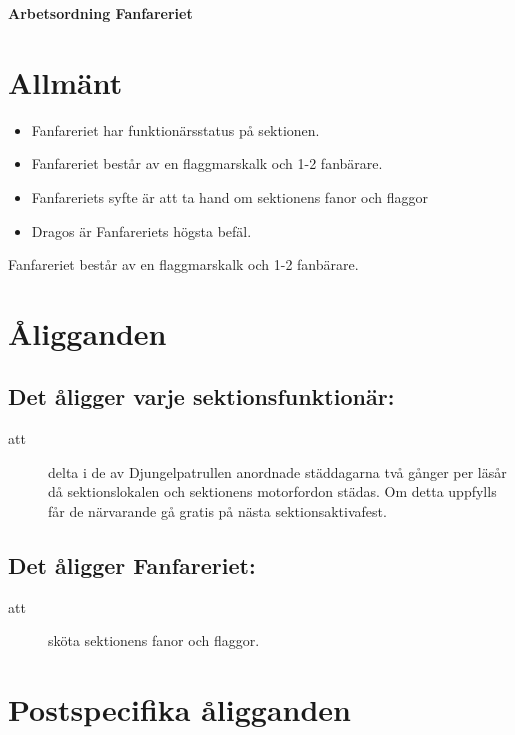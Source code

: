 \renewcommand{\dateseparator}{-} %

\renewcommand{\forening}{Fysikteknologsektionens Fanfareri}

\begin{center}
\LARGE{\textbf{Arbetsordning Fanfareriet}}
\end{center}


\section{Allmänt}
\begin{itemize}
\item Fanfareriet har funktionärsstatus på sektionen.
\item Fanfareriet består av en flaggmarskalk och 1-2 fanbärare.
\item Fanfareriets syfte är att ta hand om sektionens fanor och flaggor
\item Dragos är Fanfareriets högsta befäl.
\end{itemize}

Fanfareriet består av en flaggmarskalk och 1-2 fanbärare.

\section{Åligganden}
\subsection{Det åligger varje sektionsfunktionär:}
    \begin{description}
      \item[att] delta i de av Djungelpatrullen anordnade städdagarna två gånger per
      läsår då sektionslokalen och sektionens motorfordon städas. Om detta uppfylls får de närvarande gå gratis på nästa
      sektionsaktivafest.
    \end{description}

\subsection{Det åligger Fanfareriet:}
    \begin{description}
      \item[att] sköta sektionens fanor och flaggor.
    \end{description}

\section{Postspecifika åligganden}
